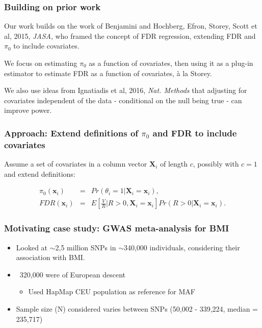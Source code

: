 \documentclass{beamer}
\newcommand{\bX}{\mathbf{X}}
\newcommand{\bx}{\mathbf{x}}
\begin{document}

\begin{frame}
\frametitle{Building on prior work}

Our work builds on the work of Benjamini and Hochberg, Efron, Storey, Scott et al, 2015, \textit{JASA},
who framed the concept of {\color{red}FDR regression}, extending FDR and $\pi_0$ to include covariates.\\ \vspace{0.5cm}

We focus on estimating $\pi_0$ as a function of covariates, then using it as a plug-in estimator to estimate FDR as a function of
covariates, \`{a} la Storey.\\ \vspace{0.5cm}

We also use ideas from Ignatiadis et al, 2016, \textit{Nat. Methods} that adjusting for covariates independent of the data - conditional on 
the null being true - can improve power.

\end{frame}


\begin{frame}
\frametitle{Approach: Extend definitions of $\pi_0$ and FDR to include covariates}

Assume a set of covariates in a column vector $\bX_i$ of length $c$, possibly with $c=1$ and extend definitions:


\begin{eqnarray*}
\pi_0(\bx_i) &=& Pr(\theta_i = 1|\bX_i=\bx_i),\\
FDR(\bx_i) &=& E \left [  \frac{V}{R} \bigg| R > 0, \bX_i=\bx_i \right ] Pr(R > 0|\bX_i=\bx_i).
\end{eqnarray*}


\end{frame}


\begin{frame}
\frametitle{Motivating case study: GWAS meta-analysis for BMI}

\begin{itemize}
\item Looked at $\sim$2,5 million SNPs in $\sim$340,000 individuals, considering their association with BMI.
\vspace{0.5cm}
\item ~320,000 were of European descent
\begin{itemize}
\item Used HapMap CEU population as reference for MAF
\end{itemize}
\vspace{0.5cm}
\item Sample size (N) considered varies between SNPs (50,002 - 339,224, median = 235,717)
\end{itemize}

\end{frame}
\end{document}
